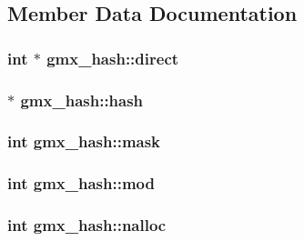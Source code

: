 \subsection{\-Member \-Data \-Documentation}
\hypertarget{structgmx__hash_a4421dc74efccb5a2d3e2bcac6691492c}{
\subsubsection[{direct}]{\setlength{\rightskip}{0pt plus 5cm}int $\ast$ {\bf gmx\-\_\-hash\-::direct}}}\label{structgmx__hash_a4421dc74efccb5a2d3e2bcac6691492c}
\hypertarget{structgmx__hash_a0ba6094d98a2cfc544071a2d800a0da3}{
\subsubsection[{hash}]{ $\ast$ {\bf gmx\-\_\-hash\-::hash}}}\label{structgmx__hash_a0ba6094d98a2cfc544071a2d800a0da3}
\hypertarget{structgmx__hash_a330f012736c300c6aa5365de9a28088d}{
\subsubsection[{mask}]{\setlength{\rightskip}{0pt plus 5cm}int {\bf gmx\-\_\-hash\-::mask}}}\label{structgmx__hash_a330f012736c300c6aa5365de9a28088d}
\hypertarget{structgmx__hash_afca27eec49c47806ebd4894afa0a788d}{
\subsubsection[{mod}]{\setlength{\rightskip}{0pt plus 5cm}int {\bf gmx\-\_\-hash\-::mod}}}\label{structgmx__hash_afca27eec49c47806ebd4894afa0a788d}
\hypertarget{structgmx__hash_a256532b2084c2e332cc7b3328265d143}{
\subsubsection[{nalloc}]{\setlength{\rightskip}{0pt plus 5cm}int {\bf gmx\-\_\-hash\-::nalloc}}}\label{structgmx__hash_a256532b2084c2e332cc7b3328265d143}
